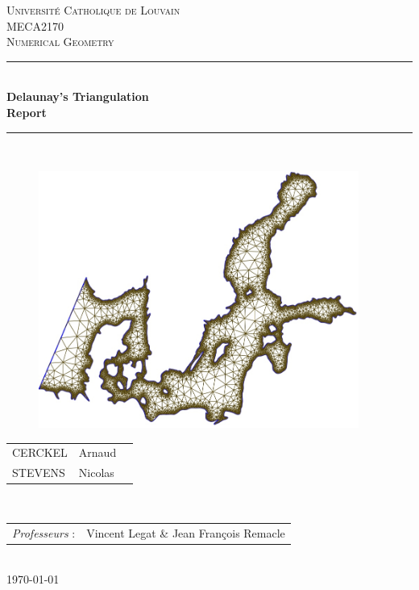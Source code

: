 \begin{titlepage}
\newcommand{\HRule}{\rule{\linewidth}{0.5mm}} %
\centering %
 
\null
\vspace{1cm}
\textsc{\Large Université Catholique de Louvain}\\[1cm] %
\textsc{\large MECA2170 \\[0.3cm] Numerical Geometry}\\[0.5cm] %


\HRule \\[0.4cm]
{ \LARGE \bfseries Delaunay's Triangulation\\[0.4cm] %
\large \bfseries Report} \\[0.4cm]

\HRule \\[0.5cm]
 
\begin{figure}[!h]
	\begin{center}
		\includegraphics[width=10.5cm]{images/cover.jpg}
	\end{center}
\end{figure}


\large 
\centering
{\begin{tabular}{lll}
\textsc{CERCKEL} & Arnaud\\
\textsc{STEVENS} & Nicolas\\
\end{tabular}}
\\[1cm]

\normalsize
{\begin{tabular}{ll}
\textit{Professeurs} : & Vincent Legat \& Jean François Remacle\\
\end{tabular}}
\\[1cm]


{\normalsize \today}\\[2cm] %

\end{titlepage}
\newpage